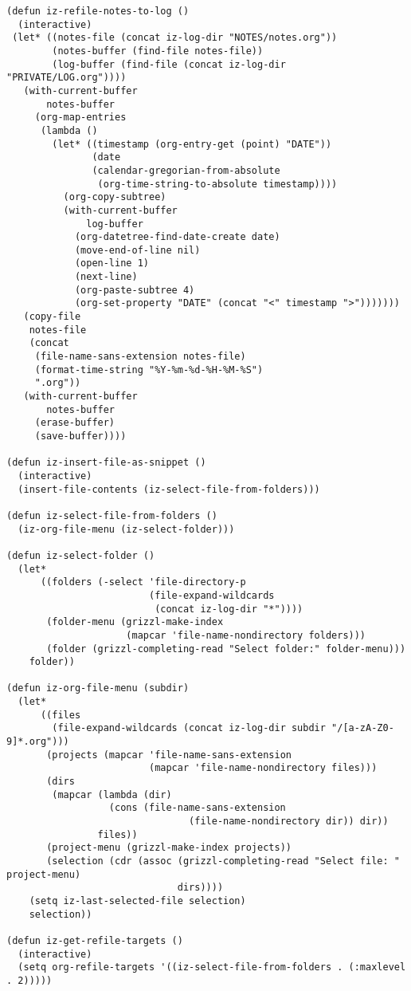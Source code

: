 \documentclass[10pt]{article}
\begin{document}
\begin{verbatim}
(defun iz-refile-notes-to-log ()
  (interactive)
 (let* ((notes-file (concat iz-log-dir "NOTES/notes.org"))
        (notes-buffer (find-file notes-file))
        (log-buffer (find-file (concat iz-log-dir "PRIVATE/LOG.org"))))
   (with-current-buffer
       notes-buffer
     (org-map-entries
      (lambda ()
        (let* ((timestamp (org-entry-get (point) "DATE"))
               (date
               (calendar-gregorian-from-absolute
                (org-time-string-to-absolute timestamp))))
          (org-copy-subtree)
          (with-current-buffer
              log-buffer
            (org-datetree-find-date-create date)
            (move-end-of-line nil)
            (open-line 1)
            (next-line)
            (org-paste-subtree 4)
            (org-set-property "DATE" (concat "<" timestamp ">")))))))
   (copy-file
    notes-file
    (concat
     (file-name-sans-extension notes-file)
     (format-time-string "%Y-%m-%d-%H-%M-%S")
     ".org"))
   (with-current-buffer
       notes-buffer
     (erase-buffer)
     (save-buffer))))

(defun iz-insert-file-as-snippet ()
  (interactive)
  (insert-file-contents (iz-select-file-from-folders)))

(defun iz-select-file-from-folders ()
  (iz-org-file-menu (iz-select-folder)))

(defun iz-select-folder ()
  (let*
      ((folders (-select 'file-directory-p
                         (file-expand-wildcards
                          (concat iz-log-dir "*"))))
       (folder-menu (grizzl-make-index
                     (mapcar 'file-name-nondirectory folders)))
       (folder (grizzl-completing-read "Select folder:" folder-menu)))
    folder))

(defun iz-org-file-menu (subdir)
  (let*
      ((files
        (file-expand-wildcards (concat iz-log-dir subdir "/[a-zA-Z0-9]*.org")))
       (projects (mapcar 'file-name-sans-extension
                         (mapcar 'file-name-nondirectory files)))
       (dirs
        (mapcar (lambda (dir)
                  (cons (file-name-sans-extension
                                (file-name-nondirectory dir)) dir))
                files))
       (project-menu (grizzl-make-index projects))
       (selection (cdr (assoc (grizzl-completing-read "Select file: " project-menu)
                              dirs))))
    (setq iz-last-selected-file selection)
    selection))

(defun iz-get-refile-targets ()
  (interactive)
  (setq org-refile-targets '((iz-select-file-from-folders . (:maxlevel . 2)))))


\end{verbatim}
\end{document}
